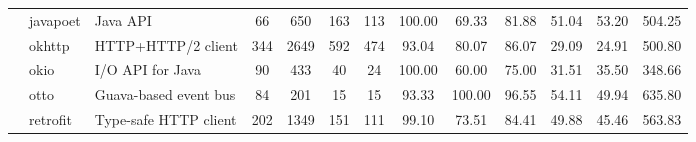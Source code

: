 \begin{table*}[]
{\begin{tabular}{lll|ccc|cccc|ccc}
                            & javapoet                                                      & Java API                                                                 & 66             & 650             & 163                                                              & 113            & 100.00         & 69.33          & 81.88          & 51.04                                                             & 53.20                                                              & 504.25                                               \\
                            & okhttp                                                        & HTTP+HTTP/2 client                                                       & 344            & 2649            & 592                                                              & 474            & 93.04          & 80.07          & 86.07          & 29.09                                                             & 24.91                                                              & 500.80                                               \\
                            & okio                                                          & I/O API for Java                                                         & 90             & 433             & 40                                                               & 24             & 100.00         & 60.00          & 75.00          & 31.51                                                             & 35.50                                                              & 348.66                                               \\
                            & otto                                                          & Guava-based event bus                                                    & 84             & 201             & 15                                                               & 15             & 93.33          & 100.00         & 96.55          & 54.11                                                             & 49.94                                                              & 635.80                                               \\
                            & retrofit                                                      & Type-safe HTTP client                                                    & 202            & 1349            & 151                                                              & 111            & 99.10          & 73.51          & 84.41          & 49.88                                                             & 45.46                                                              & 563.83                                               \\ \hline

\end{tabular}}
\end{table*}
